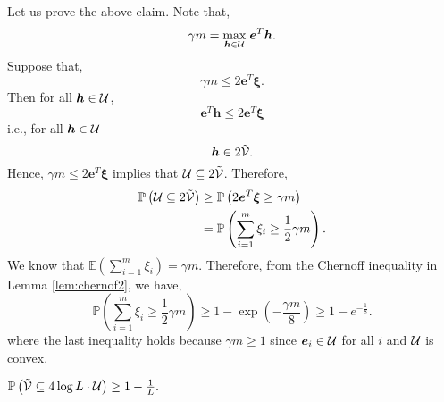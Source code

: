 \documentclass[moor]{informs1}              %
\newcommand{\mb}[1]{\ensuremath{\boldsymbol{#1}}}
\begin{document}
\noindent
Let us prove the above claim. Note that,
 $$ \gamma  m =\underset{\mb h \in {\cal U}}{\max} \;  \mb e^T \mb h. $$
 Suppose that, $$\gamma  m \leq 2 \mb e^T \mb {\xi}.$$ Then for all $\mb h \in{\cal U}$,
 $$\mb e^T \mb h \leq 2 \mb e^T \mb {\xi}$$
i.e., for all $\mb h \in{\cal U}$
 $$ \mb h \in 2 \tilde{\cal V}.$$ 
Hence, $\gamma  m \leq 2 \mb e^T \mb {\xi}$ implies that ${\cal U} \subseteq 2  \tilde{\cal V}$.
Therefore,
\begin{align*}
 \mathbb{P} \left( {\cal U} \subseteq 2  \tilde{\cal V} \right)  & \geq  \mathbb{P} \left(    2 \mb e^T \mb{\xi} \geq \gamma  m   \right) \\
 &=   \mathbb{P} \left( \sum_{i=1}^m {\xi}_i \geq \frac{1}{2} \gamma m   \right).
\end{align*}
We know that $ \mathbb{E} \left( \sum_{i=1}^m {\xi}_i \right) = \gamma m $. Therefore, from the Chernoff inequality in Lemma \ref{lem:chernof2}, we have,
$$ \mathbb{P} \left( \sum_{i=1}^m {\xi}_i \geq \frac{1}{2} \gamma m   \right) \geq  1- \exp \left(- \frac{\gamma m}{8} \right) \geq   1-  e^{-\frac{1}{8}}.$$
where the last inequality holds because $\gamma m \geq 1$ since $\mb e_i \in {\cal U}$ for all $i$ and $\cal U$ is convex.


\begin{claim}\label{claim:5.2} 
$\mathbb{P} \left(  \tilde{\cal V} \subseteq  4 \log L \cdot {\cal U} \right) \geq 1- \frac{1}{L}.$
\end{claim}
\end{document}
